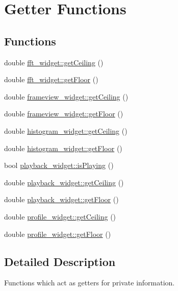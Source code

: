 \hypertarget{group__getters}{\section{Getter Functions}
\label{group__getters}
}
\subsection*{Functions}
\begin{DoxyCompactItemize}
\item 
double \hyperlink{group__getters_gad5640a1300a47010e98f518bd11ab56e}{fft\+\_\+widget\+::get\+Ceiling} ()
\item 
double \hyperlink{group__getters_ga233ad29936526df1f61573a90698e644}{fft\+\_\+widget\+::get\+Floor} ()
\item 
double \hyperlink{group__getters_gaddbeea24241fb3ff7f54484fe3b104b5}{frameview\+\_\+widget\+::get\+Ceiling} ()
\item 
double \hyperlink{group__getters_ga64d9bcc11926e2d51c98bf3b262d6b1f}{frameview\+\_\+widget\+::get\+Floor} ()
\item 
double \hyperlink{group__getters_gaf5feaf6965cdfac1bbf9be88f0a6c86b}{histogram\+\_\+widget\+::get\+Ceiling} ()
\item 
double \hyperlink{group__getters_ga425122f9d79ceb31f8ed8b1bc54c380f}{histogram\+\_\+widget\+::get\+Floor} ()
\item 
bool \hyperlink{group__getters_ga601167298dbe870b1f2e9591f9372a75}{playback\+\_\+widget\+::is\+Playing} ()
\item 
double \hyperlink{group__getters_gab47096c65caf5ac4f58049350a7a8289}{playback\+\_\+widget\+::get\+Ceiling} ()
\item 
double \hyperlink{group__getters_gaf9c55fffe8aebf0cfb7c00b33b1e1a04}{playback\+\_\+widget\+::get\+Floor} ()
\item 
double \hyperlink{group__getters_gaddbd0d14d726d6c732552a570d3423cc}{profile\+\_\+widget\+::get\+Ceiling} ()
\item 
double \hyperlink{group__getters_ga778c07bb85d7cc0bb69c869354a8f3e3}{profile\+\_\+widget\+::get\+Floor} ()
\end{DoxyCompactItemize}


\subsection{Detailed Description}
Functions which act as getters for private information. 

